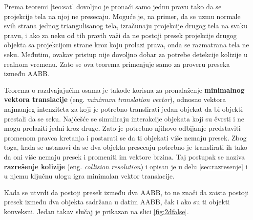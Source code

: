 \documentclass[12pt,oneside]{memoir}
\begin{document}
Prema teoremi \ref{teo:sat} dovoljno je pronaći samo jednu pravu tako da se projekcije tela na njoj ne presecaju.
Moguće je, na primer, da se uzmu normale svih strana jednog triangulisanog tela, izračunaju projekcije drugog 
tela na svaku pravu, i ako za neku od tih pravih važi da ne postoji presek projekcije drugog objekta sa projekcijom strane kroz koju prolazi prava, onda se razmatrana tela ne seku.
Međutim, ovakav pristup nije dovoljno dobar za potrebe detekcije kolizije u realnom vremenu. 
Zato se  ova teorema primenjuje samo za proveru preseka između AABB.

Teorema o razdvajajućim osama je takođe korisna za pronalaženje \textbf{minimalnog vektora translacije} (eng. {\em minimum translation vector}), odnosno
vektora najmanjeg intenziteta za koji je potrebno translirati jedan objekat da bi objekti prestali da se seku.
Najčešće se simuliraju interakcije objekata koji su čvrsti i ne mogu prolaziti jedni kroz druge.
Zato je potrebno njihovo odbijanje predstaviti promenom pravca kretanja i postarati se da ti objekati više nemaju presek.
Zbog toga, kada se ustanovi da se dva objekta presecaju potrebno je translirati ih tako da oni više nemaju presek i promeniti im vektore brzina.
Taj postupak se naziva \textbf{razrešenje kolizije} (eng. {\em collision resolution}) i opisan je u delu \ref{sec:razresenje} i u njemu ključnu ulogu igra minimalan vektor translacije.

Kada se utvrdi da postoji presek između dva AABB, to ne znači da zaista postoji presek između dva objekta
sadržana u datim AABB, čak i ako su ti objekti konveksni. Jedan takav slučaj je prikazan na slici \ref{fig:2dfalse}. 
\end{document}
